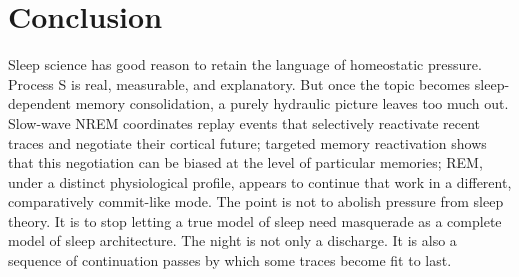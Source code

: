 \documentclass[11pt]{article}
\begin{document}
\section{Conclusion}
Sleep science has good reason to retain the language of homeostatic pressure. Process S is real, measurable, and explanatory. But once the topic becomes sleep-dependent memory consolidation, a purely hydraulic picture leaves too much out. Slow-wave NREM coordinates replay events that selectively reactivate recent traces and negotiate their cortical future; targeted memory reactivation shows that this negotiation can be biased at the level of particular memories; REM, under a distinct physiological profile, appears to continue that work in a different, comparatively commit-like mode. The point is not to abolish pressure from sleep theory. It is to stop letting a true model of sleep need masquerade as a complete model of sleep architecture. The night is not only a discharge. It is also a sequence of continuation passes by which some traces become fit to last.
\end{document}
